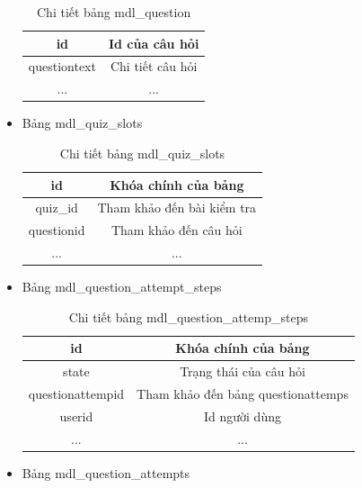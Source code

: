 \begin{itemize}
\begin{center}
		\begin{table}[!htp]
			\centering
			\begin{tabular}{|c|c|}
				\hline 
				id & Id của câu hỏi \\ 
				\hline 
				questiontext & Chi tiết câu hỏi \\ 
				\hline 
				... & ... \\ 
				\hline 
			\end{tabular} 
			\caption{Chi tiết bảng mdl\_question}
			\label{bang12}
		\end{table}
	\end{center}
	\item Bảng mdl\_quiz\_slots
	\begin{center}
		\begin{table}[!htp]
			\centering
			\begin{tabular}{|c|c|}
				\hline 
				id & Khóa chính của bảng \\ 
				\hline 
				quiz\_id & Tham khảo đến bài kiểm tra \\ 
				\hline 
				questionid & Tham khảo đến câu hỏi \\ 
				\hline 
				... & ... \\ 
				\hline 
			\end{tabular} 
			\caption{Chi tiết bảng mdl\_quiz\_slots}
			\label{bang13}
		\end{table}
	\end{center}
	\item Bảng mdl\_question\_attempt\_steps
	\begin{center}
		\begin{table}[!htp]
			\centering
			\begin{tabular}{|c|c|}
				\hline 
				id & Khóa chính của bảng \\ 
				\hline 
				state & Trạng thái của câu hỏi \\ 
				\hline 
				questionattempid & Tham khảo đến bảng questionattemps \\ 
				\hline 
				userid & Id người dùng \\
				\hline
				... & ... \\ 
				\hline 
			\end{tabular} 
			\caption{Chi tiết bảng mdl\_question\_attemp\_steps}
			\label{bang14}
		\end{table}
	\end{center}
	\item Bảng mdl\_question\_attempts
	\begin{center}
		\begin{table}[!htp]

\end{table}
\end{center}
\end{itemize}
